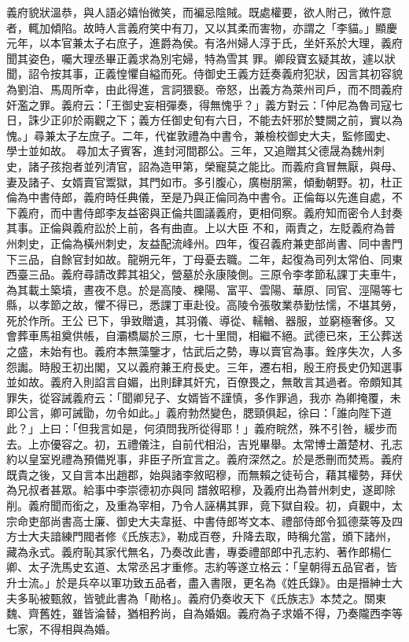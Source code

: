 \begin{pinyinscope}
 義府貌狀溫恭，與人語必嬉怡微笑，而褊忌陰賊。既處權要，欲人附己，微忤意者，輒加傾陷。故時人言義府笑中有刀，又以其柔而害物，亦謂之「李貓。」顯慶元年，以本官兼太子右庶子，進爵為侯。有洛州婦人淳于氏，坐奸系於大理，義府聞其姿色，囑大理丞畢正義求為別宅婦，特為雪其
 罪。卿段寶玄疑其故，遽以狀聞，詔令按其事，正義惶懼自縊而死。侍御史王義方廷奏義府犯狀，因言其初容貌為劉洎、馬周所幸，由此得進，言詞猥褻。帝怒，出義方為萊州司戶，而不問義府奸濫之罪。義府云：「王御史妄相彈奏，得無愧乎？」義方對云：「仲尼為魯司寇七日，誅少正卯於兩觀之下；義方任御史旬有六日，不能去奸邪於雙闕之前，實以為愧。」尋兼太子左庶子。二年，代崔敦禮為中書令，兼檢校御史大夫，監修國史、學士並如故。
 尋加太子賓客，進封河間郡公。三年，又追贈其父德晟為魏州刺史，諸子孩抱者並列清官，詔為造甲第，榮寵莫之能比。而義府貪冒無厭，與母、妻及諸子、女婿賣官鬻獄，其門如市。多引腹心，廣樹朋黨，傾動朝野。初，杜正倫為中書侍郎，義府時任典儀，至是乃與正倫同為中書令。正倫每以先進自處，不下義府，而中書侍郎李友益密與正倫共圖議義府，更相伺察。義府知而密令人封奏其事。正倫與義府訟於上前，各有曲直。上以大臣
 不和，兩責之，左貶義府為普州刺史，正倫為橫州刺史，友益配流峰州。四年，復召義府兼吏部尚書、同中書門下三品，自餘官封如故。龍朔元年，丁母憂去職。二年，起復為司列太常伯、同東西臺三品。義府尋請改葬其祖父，營墓於永康陵側。三原令李孝節私課丁夫車牛，為其載土築墳，晝夜不息。於是高陵、櫟陽、富平、雲陽、華原、同官、涇陽等七縣，以孝節之故，懼不得已，悉課丁車赴役。高陵令張敬業恭勤怯懦，不堪其勞，死於作所。王公
 已下，爭致贈遺，其羽儀、導從、轜輶、器服，並窮極奢侈。又會葬車馬祖奠供帳，自灞橋屬於三原，七十里間，相繼不絕。武德已來，王公葬送之盛，未始有也。義府本無藻鑒才，怙武后之勢，專以賣官為事。銓序失次，人多怨讟。時殷王初出閣，又以義府兼王府長史。三年，遷右相，殷王府長史仍知選事並如故。義府入則諂言自媚，出則肆其奸宄，百僚畏之，無敢言其過者。帝頗知其罪失，從容誡義府云：「聞卿兒子、女婿皆不謹慎，多作罪過，我亦
 為卿掩覆，未即公言，卿可誡勖，勿令如此。」義府勃然變色，腮頸俱起，徐曰：「誰向陛下道此？」上曰：「但我言如是，何須問我所從得耶！」義府睆然，殊不引咎，緩步而去。上亦優容之。初，五禮儀注，自前代相沿，吉兇畢舉。太常博士蕭楚材、孔志約以皇室兇禮為預備兇事，非臣子所宜言之。義府深然之。於是悉刪而焚焉。義府既貴之後，又自言本出趙郡，始與諸李敘昭穆，而無賴之徒茍合，藉其權勢，拜伏為兄叔者甚眾。給事中李崇德初亦與同
 譜敘昭穆，及義府出為普州刺史，遂即除削。義府聞而銜之，及重為宰相，乃令人誣構其罪，竟下獄自殺。初，貞觀中，太宗命吏部尚書高士廉、御史大夫韋挺、中書侍郎岑文本、禮部侍郎令狐德棻等及四方士大夫諳練門閥者修《氏族志》，勒成百卷，升降去取，時稱允當，頒下諸州，藏為永式。義府恥其家代無名，乃奏改此書，專委禮部郎中孔志約、著作郎楊仁卿、太子洗馬史玄道、太常丞呂才重修。志約等遂立格云：「皇朝得五品官者，皆
 升士流。」於是兵卒以軍功致五品者，盡入書限，更名為《姓氏錄》。由是搢紳士大夫多恥被甄敘，皆號此書為「勛格」。義府仍奏收天下《氏族志》本焚之。關東魏、齊舊姓，雖皆淪替，猶相矜尚，自為婚姻。義府為子求婚不得，乃奏隴西李等七家，不得相與為婚。




\end{pinyinscope}
